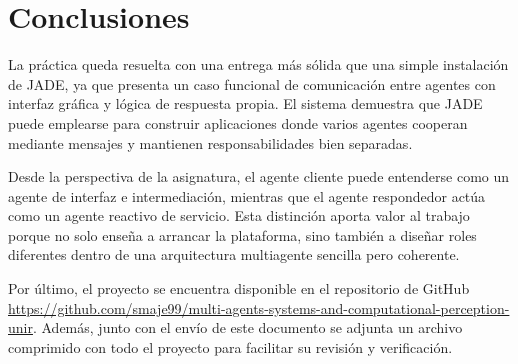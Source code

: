 \documentclass[12pt]{article}
\begin{document}
\section{Conclusiones}
La práctica queda resuelta con una entrega más sólida que una simple instalación de JADE, ya que presenta un caso funcional de comunicación entre agentes con interfaz gráfica y lógica de respuesta propia. El sistema demuestra que JADE puede emplearse para construir aplicaciones donde varios agentes cooperan mediante mensajes y mantienen responsabilidades bien separadas.

Desde la perspectiva de la asignatura, el agente cliente puede entenderse como un agente de interfaz e intermediación, mientras que el agente respondedor actúa como un agente reactivo de servicio. Esta distinción aporta valor al trabajo porque no solo enseña a arrancar la plataforma, sino también a diseñar roles diferentes dentro de una arquitectura multiagente sencilla pero coherente.

Por último, el proyecto se encuentra disponible en el repositorio de GitHub \url{https://github.com/smaje99/multi-agents-systems-and-computational-perception-unir}. Además, junto con el envío de este documento se adjunta un archivo comprimido con todo el proyecto para facilitar su revisión y verificación.



\end{document}
